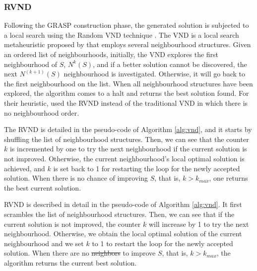 \documentclass{singlecol-new}
\providecommand{\DIFadd}[1]{{\protect\color{blue}\uwave{#1}}} %
\providecommand{\DIFdel}[1]{{\protect\color{red}\sout{#1}}}                      %
\providecommand{\DIFaddbegin}{} %
\providecommand{\DIFaddend}{} %
\providecommand{\DIFdelbegin}{} %
\providecommand{\DIFdelend}{} %
\begin{document}
\subsubsection{RVND}
Following the GRASP construction phase, the generated solution is subjected to a local search using the Random VND technique \citep{mladenovic12}. The VND is a local search metaheuristic proposed by \citet{mladenovic97} that employs several neighbourhood structures. Given an ordered list of neighbourhoods, initially, the VND explores the first neighbourhood of $S$, $N^k(S)$, and if a better solution cannot be discovered, the next $N^{(k + 1)}(S) $  neighbourhood is investigated. Otherwise, it will go back to the first neighbourhood on the list. When all neighbourhood structures have been explored, the algorithm comes to a halt and returns the best solution found. For their heuristic, \citet{daSilva} used the RVND instead of the traditional VND in which there is no neighbourhood order.




The RVND is detailed in the pseudo-code of Algorithm \ref{alg:vnd}, and it starts by shuffling the list of neighbourhood structures. Then, we can see that the counter $k$ is incremented by one to try the next neighbourhood if the current solution is not improved.
Otherwise, the current neighbourhood's local optimal solution is achieved, and $k$ is set back to 1 for restarting the loop for the newly accepted solution.
When there is no chance of improving $S$, that is, $k > k_{max}$, one returns the best current solution.

RVND is described in detail in the pseudo-code of Algorithm \ref{alg:vnd}. It first scrambles the list of neighbourhood structures. Then, we can see that if the current solution is not improved, the counter $k$ will increase by 1 to try the next neighbourhood. Otherwise, we obtain the local optimal solution of the current neighbourhood and we set $k$ to 1 to restart the loop for the newly accepted solution. When there are no \DIFdelbegin \DIFdel{neighbors }\DIFdelend \DIFaddbegin \DIFadd{neighbours }\DIFaddend to improve $S$, that is, $k> k_{max}$, the algorithm returns the current best solution.
\end{document}
